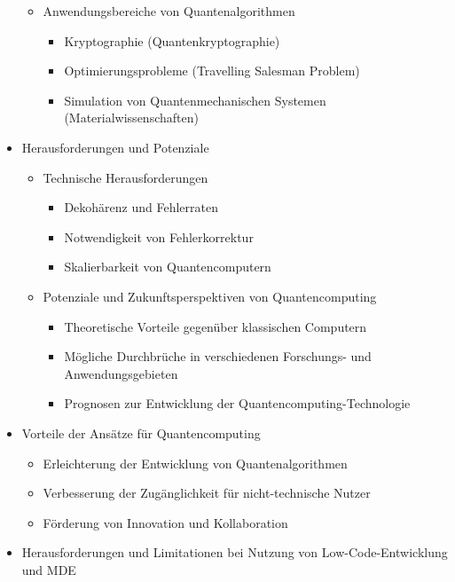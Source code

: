 \begin{itemize}
\begin{itemize}
            \item Anwendungsbereiche von Quantenalgorithmen
                \begin{itemize}
                    \item Kryptographie (Quantenkryptographie)
                    \item Optimierungsprobleme (Travelling Salesman Problem)
                    \item Simulation von Quantenmechanischen Systemen (Materialwissenschaften)
                \end{itemize}
        \end{itemize}
    \item Herausforderungen und Potenziale
        \begin{itemize}
            \item Technische Herausforderungen
                \begin{itemize}
                    \item Dekohärenz und Fehlerraten
                    \item Notwendigkeit von Fehlerkorrektur
                    \item Skalierbarkeit von Quantencomputern
                \end{itemize}
            \item Potenziale und Zukunftsperspektiven von Quantencomputing
                \begin{itemize}
                    \item Theoretische Vorteile gegenüber klassischen Computern
                    \item Mögliche Durchbrüche in verschiedenen Forschungs- und Anwendungsgebieten
                    \item Prognosen zur Entwicklung der Quantencomputing-Technologie
                \end{itemize}
        \end{itemize}
        \item Vorteile der Ansätze für Quantencomputing
        \begin{itemize}
            \item Erleichterung der Entwicklung von Quantenalgorithmen
            \item Verbesserung der Zugänglichkeit für nicht-technische Nutzer
            \item Förderung von Innovation und Kollaboration
        \end{itemize}
    \item Herausforderungen und Limitationen bei Nutzung von Low-Code-Entwicklung und MDE

\end{itemize}
